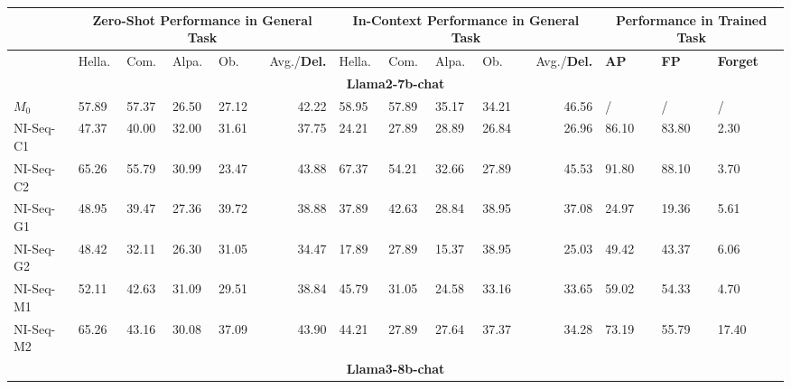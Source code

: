 \begin{table*}[]
\begin{center}
\begin{tiny}
\begin{tabular}{l|llllr|llllr|lll}
\toprule
 & \multicolumn{5}{c|}{Zero-Shot Performance in General Task} & \multicolumn{5}{c|}{In-Context Performance in General Task} & \multicolumn{3}{c}{Performance in Trained Task} \\ \midrule
 & Hella. & Com. & Alpa. & Ob. & Avg./\textbf{Del.} & Hella. & Com. & Alpa. & Ob. & Avg./\textbf{Del.} & \textbf{AP} & \textbf{FP} & \textbf{Forget} \\ \midrule
  \multicolumn{14}{c}{\textbf{Llama2-7b-chat}} \\ \midrule
$M_0$ & 57.89 & 57.37 & 26.50 & 27.12 & 42.22 & 58.95 & 57.89 & 35.17 & 34.21 & 46.56 & / & / & / \\
NI-Seq-C1 & 47.37 & 40.00 & 32.00 & 31.61 & 37.75 & 24.21 & 27.89 & 28.89 & 26.84 & 26.96 & 86.10 & 83.80 & 2.30 \\
NI-Seq-C2 & 65.26 & 55.79 & 30.99 & 23.47 & 43.88 & 67.37 & 54.21 & 32.66 & 27.89 & 45.53 & 91.80 & 88.10 & 3.70 \\
NI-Seq-G1 & 48.95 & 39.47 & 27.36 & 39.72 & 38.88 & 37.89 & 42.63 & 28.84 & 38.95 & 37.08 & 24.97 & 19.36 & 5.61 \\
NI-Seq-G2 & 48.42 & 32.11 & 26.30 & 31.05 & 34.47 & 17.89 & 27.89 & 15.37 & 38.95 & 25.03 & 49.42 & 43.37 & 6.06 \\
NI-Seq-M1 & 52.11 & 42.63 & 31.09 & 29.51 & 38.84 & 45.79 & 31.05 & 24.58 & 33.16 & 33.65 & 59.02 & 54.33 & 4.70 \\
NI-Seq-M2 & 65.26 & 43.16 & 30.08 & 37.09 & 43.90 & 44.21 & 27.89 & 27.64 & 37.37 & 34.28 & 73.19 & 55.79 & 17.40 \\ \midrule
\multicolumn{14}{c}{\textbf{Llama3-8b-chat}} \\ \midrule


\end{tabular}
\end{tiny}
\end{center}
\end{table*}
